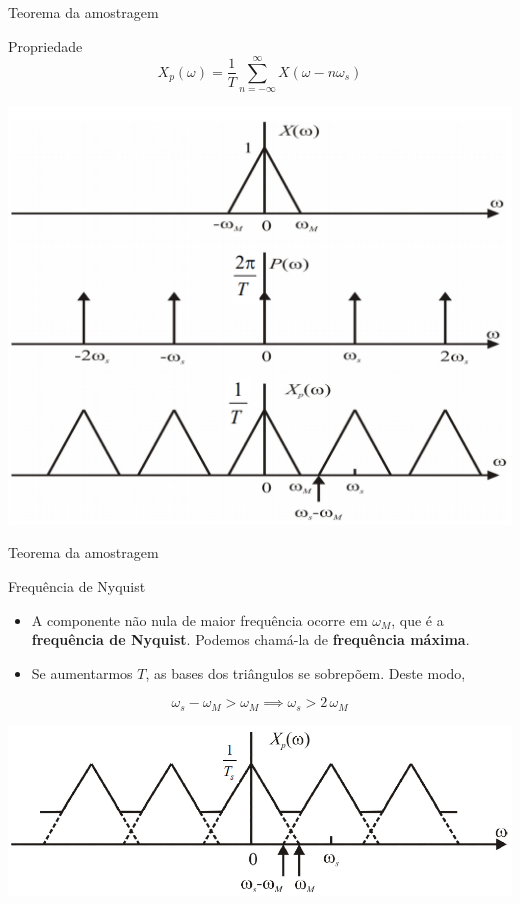 \begin{frame}{Teorema da amostragem}
\begin{block}{Propriedade}
$$\boxed{X_p(\omega) = \dfrac{1}{T}\sum_{n=-\infty}^{\infty}X(\omega - n\omega_s)}$$
\end{block}
\centerline{\includegraphics[width=0.5\linewidth]{Figuras/Ch02/fig10.PNG}}
\end{frame}

\begin{frame}{Teorema da amostragem}
\begin{block}{Frequência de Nyquist}
\begin{itemize}
    \item A componente não nula de maior frequência ocorre em $\omega_M$, que é a \textbf{frequência de Nyquist}. Podemos chamá-la de \textbf{frequência máxima}.
    \item Se aumentarmos $T$, as bases dos triângulos se sobrepõem. Deste modo,
\end{itemize}
$$\omega_s - \omega_M > \omega_M \implies \boxed{\omega_s > 2 \, \omega_M}$$
\end{block}
\vspace{0.5cm}
\centerline{\includegraphics[width=0.9\linewidth]{Figuras/Ch02/fig11.PNG}}
\end{frame}


